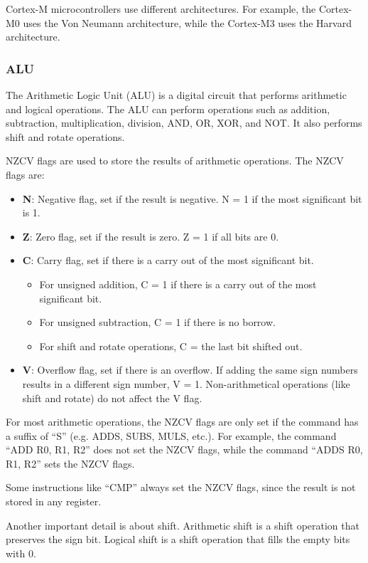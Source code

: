 \documentclass[a4paper,12pt]{article}
\begin{document}
Cortex-M microcontrollers use different architectures. For example, the Cortex-M0 uses the Von Neumann architecture, while the Cortex-M3 uses the Harvard architecture.

\subsubsection{ALU}

The Arithmetic Logic Unit (ALU) is a digital circuit that performs arithmetic and logical operations. The ALU can perform operations such as addition, subtraction, multiplication, division, AND, OR, XOR, and NOT. It also performs shift and rotate operations.

NZCV flags are used to store the results of arithmetic operations. The NZCV flags are:
\begin{itemize}
	\item \textbf{N}: Negative flag, set if the result is negative. N = 1 if the most significant bit is 1.
	\item \textbf{Z}: Zero flag, set if the result is zero. Z = 1 if all bits are 0.
	\item \textbf{C}: Carry flag, set if there is a carry out of the most significant bit. \begin{itemize}
		\item For unsigned addition, C = 1 if there is a carry out of the most significant bit.
		\item For unsigned subtraction, C = 1 if there is no borrow.
		\item For shift and rotate operations, C = the last bit shifted out.
	\end{itemize}
	\item \textbf{V}: Overflow flag, set if there is an overflow. If adding the same sign numbers results in a different sign number, V = 1. Non-arithmetical operations (like shift and rotate) do not affect the V flag.
\end{itemize}

For most arithmetic operations, the NZCV flags are only set if the command has a suffix of ``S'' (e.g. ADDS, SUBS, MULS, etc.). For example, the command ``ADD R0, R1, R2'' does not set the NZCV flags, while the command ``ADDS R0, R1, R2'' sets the NZCV flags.

Some instructions like ``CMP'' always set the NZCV flags, since the result is not stored in any register.

Another important detail is about shift. Arithmetic shift is a shift operation that preserves the sign bit. Logical shift is a shift operation that fills the empty bits with 0.
\end{document}
